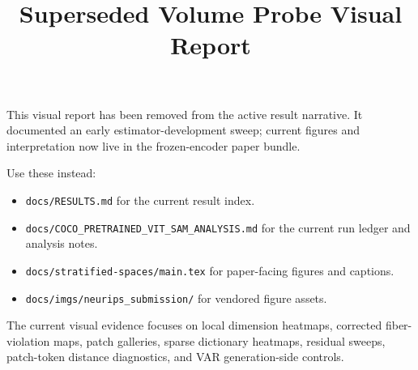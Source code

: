 \documentclass{article}
\title{Superseded Volume Probe Visual Report}
\date{}
\begin{document}
\maketitle

This visual report has been removed from the active result narrative. It documented an early estimator-development sweep; current figures and interpretation now live in the frozen-encoder paper bundle.

Use these instead:
\begin{itemize}
\item \texttt{docs/RESULTS.md} for the current result index.
\item \texttt{docs/COCO\_PRETRAINED\_VIT\_SAM\_ANALYSIS.md} for the current run ledger and analysis notes.
\item \texttt{docs/stratified-spaces/main.tex} for paper-facing figures and captions.
\item \texttt{docs/imgs/neurips\_submission/} for vendored figure assets.
\end{itemize}

The current visual evidence focuses on local dimension heatmaps, corrected fiber-violation maps, patch galleries, sparse dictionary heatmaps, residual sweeps, patch-token distance diagnostics, and VAR generation-side controls.
\end{document}
